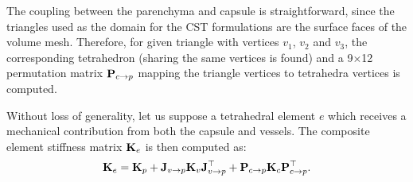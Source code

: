 The coupling between the parenchyma and capsule is straightforward, since the triangles used as the 
domain for the CST formulations are the surface faces of the volume mesh. Therefore, for given triangle 
with vertices $v_1$, $v_2$ and $v_3$, the corresponding tetrahedron (sharing the same vertices is found) and 
a 9$\times$12 permutation matrix $\mathbf{P}_{c\rightarrow p}$ mapping the triangle vertices to tetrahedra vertices is computed. 

Without loss of generality, let us suppose a tetrahedral element $e$ 
which receives a mechanical contribution from both the capsule and vessels. The composite element stiffness matrix $\mathbf{K}_e$
is then computed as:
\begin{equation}
\mathbf{K}_e = \mathbf{K}_p + \mathbf{J}_{v\rightarrow p} \mathbf{K}_v \mathbf{J}^\top_{v\rightarrow p} + \mathbf{P}_{c\rightarrow p} \mathbf{K}_c \mathbf{P}_{c\rightarrow p}^\top.
\end{equation}


% 
% 

